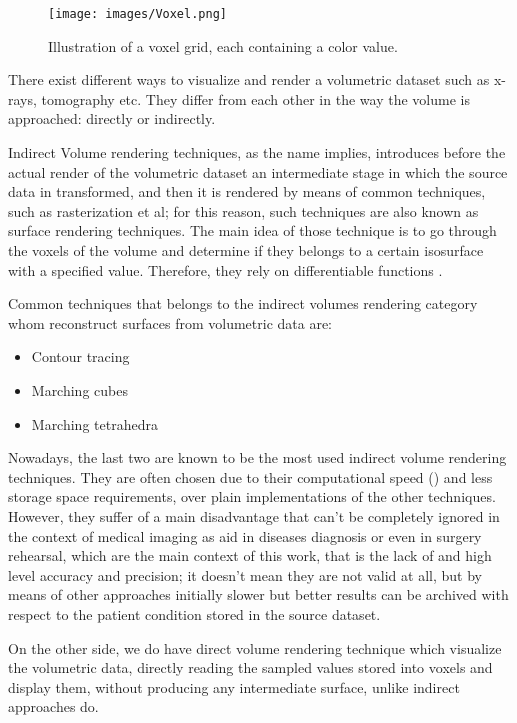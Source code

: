 \documentclass[12pt,a4paper]{extarticle}
\newcommand{\linespace}{\vspace{0pt}}
\begin{document}
\begin{figure}[hbtp]
\centering
\texttt{[image: images/Voxel.png]}
\caption{Illustration of a voxel grid, each containing a color value.}
\label{fig:voxel}
\end{figure}

There exist different ways to visualize and render a volumetric dataset such as x-rays, tomography etc. They differ from each other in the way the volume is approached: directly or indirectly.
\linespace

Indirect Volume rendering techniques, as the name implies, introduces before the actual render of the volumetric dataset an intermediate stage in which the source data in transformed, and then it is rendered by means of common techniques, such as rasterization et al; for this reason, such techniques are also known as surface rendering techniques.
The main idea of those technique is to go through the voxels of the volume and determine if they belongs to a certain isosurface with a specified value. Therefore, they rely on differentiable functions \cite{levoy_1988:4}.


Common techniques that belongs to the indirect volumes rendering category whom reconstruct surfaces from volumetric data are:
\begin{itemize}
\item Contour tracing
\item Marching cubes
\item Marching tetrahedra
\end{itemize}

Nowadays, the last two are known to be the most used indirect volume rendering techniques.
They are often chosen due to their computational speed (\cite{volume_vis_5:1})
and less storage space requirements, over plain implementations of the other techniques. However, they suffer of a main disadvantage that can't be completely ignored in the context of medical imaging as aid in diseases diagnosis or even in surgery rehearsal, which are the main context of this work, that is the lack of and high level accuracy and precision; it doesn't mean they are not valid at all, but by means of other approaches initially slower but better results can be archived with respect to the patient condition stored in the source dataset.  

On the other side, we do have direct volume rendering technique which visualize the volumetric data, directly reading the sampled values stored into voxels and display them, without producing any intermediate surface, unlike indirect approaches do. 
\linespace
\end{document}
